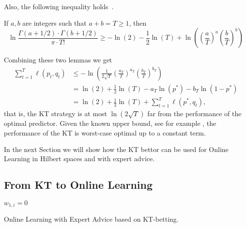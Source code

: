 Also, the following inequality holds~\citep{WillemsST95}.
\begin{lemma}
\label{lemma:approx_gamma_integer}
If $a,b$ are integers such that $a + b = T \geq 1$, then
$$
\ln \frac{\Gamma(a + 1/2) \cdot \Gamma(b + 1/2)}{\pi \cdot T!} 
\geq - \ln(2) -\frac{1}{2} \ln(T) +\ln \left(\left( \frac{a}{T} \right)^a \left( \frac{b}{T} \right)^b\right) 
$$
\end{lemma}

Combining these two lemmas we get
\begin{align*}
\sum_{t=1}^T \ell(p_t, q_t)
& \le - \ln \left( \frac{1}{2\sqrt{T}} \left( \frac{a_T}{T} \right)^{a_T} \left( \frac{b_T}{T} \right)^{b_T} \right) \\
& = \ln(2) + \frac{1}{2} \ln(T) - a_T \ln (p^*) - b_T \ln (1-p^*) \\
& = \ln(2) + \frac{1}{2} \ln(T) + \sum_{t=1}^T \ell(p^*, q_t),
\end{align*}
that is, the \ac{KT} strategy is at most $\ln(2\sqrt{T})$ far from the performance of the optimal predictor. Given the known upper bound, see for example \citet{Cesa-BianchiL06}, the performance of the \ac{KT} is worst-case optimal up to a constant term.

In the next Section we will show how the \ac{KT} bettor can be used for Online Learning in Hilbert spaces and with expert advice.


\subsection{From KT to Online Learning}

\begin{algorithm}[t]
  \begin{algorithmic}
  {
     $w_{1,i}=0$
    \ENDFOR
  }
  \end{algorithmic}
  \caption{Online Learning with Expert Advice based on \ac{KT}-betting.}
  \label{algo:kt_expert}
\end{algorithm}

